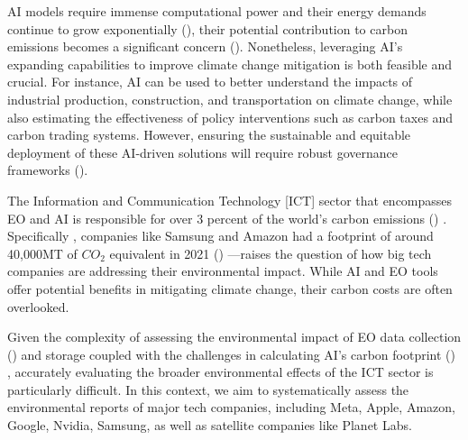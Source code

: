 \documentclass[12pt]{article}
\begin{document}
AI models require immense computational power and their energy demands continue to grow exponentially (\cite{amodei_2018}),
 their potential contribution to carbon emissions becomes a significant concern (\cite{taddeo_2021}). Nonetheless, leveraging AI’s 
 expanding capabilities to improve climate change mitigation is both feasible and crucial. 
 For instance, AI can be used to better understand the impacts of industrial production, construction, 
 and transportation on climate change, while also estimating the effectiveness of policy interventions such 
 as carbon taxes and carbon trading systems. However, ensuring the sustainable and equitable deployment of these 
 AI-driven solutions will require robust governance frameworks (\cite{taddeo_2021}).

 The  Information and Communication Technology [ICT] sector that encompasses EO and AI
is responsible for over 3 percent of the world's carbon emissions (\cite{jones_2018}) . Specifically , 
companies like Samsung and Amazon had a footprint of around 40,000MT of \(CO_2\) equivalent in 2021 (\cite{navarro_2023_the}) —raises the question 
of how big tech companies are addressing their environmental impact. While AI and EO tools offer potential benefits in 
mitigating climate change, their carbon costs are often overlooked.

Given the complexity of assessing the environmental impact of EO data collection (\cite{wilkinson_2024}) and storage coupled with the challenges in calculating AI's carbon 
footprint (\cite{Henderson_2020}) , accurately evaluating the broader environmental effects of the ICT sector is particularly difficult. In this context, we aim to systematically 
assess the environmental reports of major tech companies, including Meta, Apple, Amazon, Google, Nvidia, Samsung, as well as satellite companies like Planet Labs.
\end{document}
